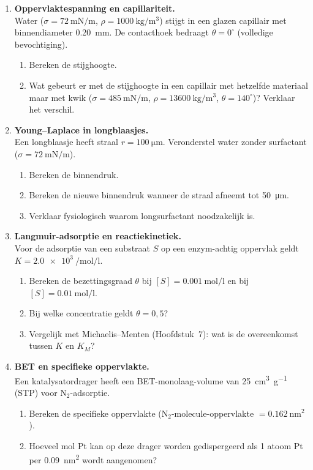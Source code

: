 \begin{enumerate}

\item \textbf{Oppervlaktespanning en capillariteit.} \\
Water ($\sigma = \SI{72}{\milli\newton\per\metre}$, $\rho = \SI{1000}{\kilogram\per\metre\cubed}$) stijgt in een glazen capillair met binnendiameter \SI{0.20}{\milli\metre}. De contacthoek bedraagt $\theta = 0^\circ$ (volledige bevochtiging).
\begin{enumerate}
\item[(a)] Bereken de stijghoogte.
\item[(b)] Wat gebeurt er met de stijghoogte in een capillair met hetzelfde materiaal maar met kwik ($\sigma = \SI{485}{\milli\newton\per\metre}$, $\rho = \SI{13600}{\kilogram\per\metre\cubed}$, $\theta = 140^\circ$)? Verklaar het verschil.
\end{enumerate}

\item \textbf{Young--Laplace in longblaasjes.} \\
Een longblaasje heeft straal $r = \SI{100}{\micro\metre}$. Veronderstel water zonder surfactant ($\sigma = \SI{72}{\milli\newton\per\metre}$).
\begin{enumerate}
\item[(a)] Bereken de binnendruk.
\item[(b)] Bereken de nieuwe binnendruk wanneer de straal afneemt tot \SI{50}{\micro\metre}.
\item[(c)] Verklaar fysiologisch waarom longsurfactant noodzakelijk is.
\end{enumerate}

\item \textbf{Langmuir-adsorptie en reactiekinetiek.} \\
Voor de adsorptie van een substraat $S$ op een enzym-achtig oppervlak geldt $K = \SI{2.0e3}{\per\mole\per\litre}$.
\begin{enumerate}
\item[(a)] Bereken de bezettingsgraad $\theta$ bij $[S] = \SI{0.001}{\mole\per\litre}$ en bij $[S] = \SI{0.01}{\mole\per\litre}$.
\item[(b)] Bij welke concentratie geldt $\theta = 0{,}5$?
\item[(c)] Vergelijk met Michaelis--Menten (Hoofdstuk~7): wat is de overeenkomst tussen $K$ en $K_M$?
\end{enumerate}

\item \textbf{BET en specifieke oppervlakte.} \\
Een katalysatordrager heeft een BET-monolaag-volume van \SI{25}{\centi\metre\cubed\per\gram} (STP) voor $\mathrm{N_2}$-adsorptie.
\begin{enumerate}
\item[(a)] Bereken de specifieke oppervlakte ($\mathrm{N_2}$-molecule-oppervlakte $= \SI{0.162}{\nano\metre\squared}$).
\item[(b)] Hoeveel mol Pt kan op deze drager worden gedispergeerd als 1 atoom Pt per \SI{0.09}{\nano\metre\squared} wordt aangenomen?
\end{enumerate}


\end{enumerate}
